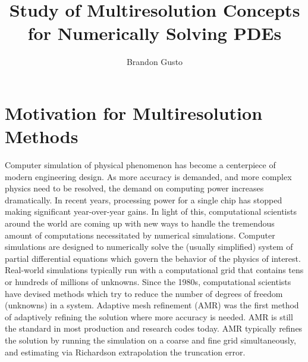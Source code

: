 \documentclass[10.5pt]{article}
\begin{document}
\title{Study of Multiresolution Concepts for Numerically Solving PDEs}
\author{Brandon Gusto \\}
\maketitle

\section*{Motivation for Multiresolution Methods}
Computer simulation of physical phenomenon has become a centerpiece of modern engineering design. As more accuracy is demanded,
and more complex physics need to be resolved, the demand on computing power increases dramatically. In recent years, processing power for a single
chip has stopped making significant year-over-year gains. In light of this, computational scientists around the world are coming up with
new ways to handle the tremendous amount of computations necessitated by numerical simulations. 
Computer simulations are designed to numerically solve the (usually simplified) system of partial differential equations which govern
the behavior of the physics of interest. Real-world simulations typically run with a computational grid that contains tens or hundreds 
of millions of unknowns. Since the 1980s, computational scientists have devised methods which try to reduce the number of degrees of 
freedom (unknowns) in a system. Adaptive mesh refinement (AMR) \cite{berger} was the first method of adaptively refining the solution where 
more accuracy is needed. AMR is still the standard in most production and research codes today. AMR typically refines the solution
by running the simulation on a coarse and fine grid simultaneously, and estimating via Richardson extrapolation the truncation error.
\end{document}

